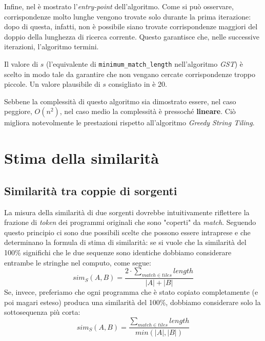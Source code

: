 

Infine, nel  è mostrato l'\textit{entry-point} dell'algoritmo.
%
Come si può osservare, corrispondenze molto lunghe vengono trovate solo durante la prima iterazione: dopo di questa, infatti, non è possibile siano trovate corrispondenze maggiori del doppio della lunghezza di ricerca corrente.
%
Questo garantisce che, nelle successive iterazioni, l'algoritmo termini.



Il valore di $s$ (l'equivalente di \texttt{minimum\_match\_length} nell'algoritmo \textit{GST}) è scelto in modo tale da garantire che non vengano cercate corrispondenze troppo piccole.
%
Un valore plausibile di $s$ consigliato in \cite{wise-running-93} è 20.

Sebbene la complessità di questo algoritmo sia dimostrato essere, nel caso peggiore, $O(n^2)$, nel caso medio la complessità è pressoché \textbf{lineare}.
%
Ciò migliora notevolmente le prestazioni rispetto all'algoritmo \textit{Greedy String Tiling}.

\section{Stima della similarità}

\subsection*{Similarità tra coppie di sorgenti}
La misura della similarità di due sorgenti dovrebbe intuitivamente riflettere la frazione di \textit{token} dei programmi originali che sono "coperti" da \textit{match}.
%
Seguendo questo principio ci sono due possibili scelte che possono essere intraprese e che determinano la formula di stima di similarità: se si vuole che la similarità del 100\% significhi che le due sequenze sono identiche dobbiamo considerare entrambe le stringhe nel computo, come segue:
%
\begin{equation}
\label{eq:max-norm-sim}
	sim_S(A, B) = \frac{2 \cdot \sum_{match \in tiles} length}{|A|+|B|}
\end{equation}
%
Se, invece, preferiamo che ogni programma che è stato copiato completamente (e poi magari esteso) produca una similarità del 100\%, dobbiamo considerare solo la sottosequenza più corta:
%
\begin{equation}
\label{eq:avg-norm-sim}
	sim_S(A, B) = \frac{\sum_{match \in tiles} length}{min(|A|, |B|)}
\end{equation} 

